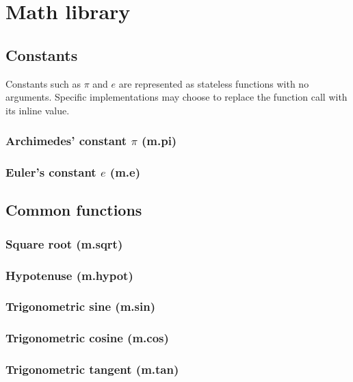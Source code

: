 \documentclass{article}
\theoremstyle{definition}
\begin{document}
\pagebreak

\section{Math library}

\subsection{Constants}

Constants such as $\pi$ and $e$ are represented as stateless functions with no arguments.  Specific implementations may choose to replace the function call with its inline value.

\subsubsection{Archimedes' constant $\pi$ (m.pi)}

\subsubsection{Euler's constant $e$ (m.e)}

\subsection{Common functions}

\subsubsection{Square root (m.sqrt)}

\subsubsection{Hypotenuse (m.hypot)}

\subsubsection{Trigonometric sine (m.sin)}

\subsubsection{Trigonometric cosine (m.cos)}

\subsubsection{Trigonometric tangent (m.tan)}
\end{document}
